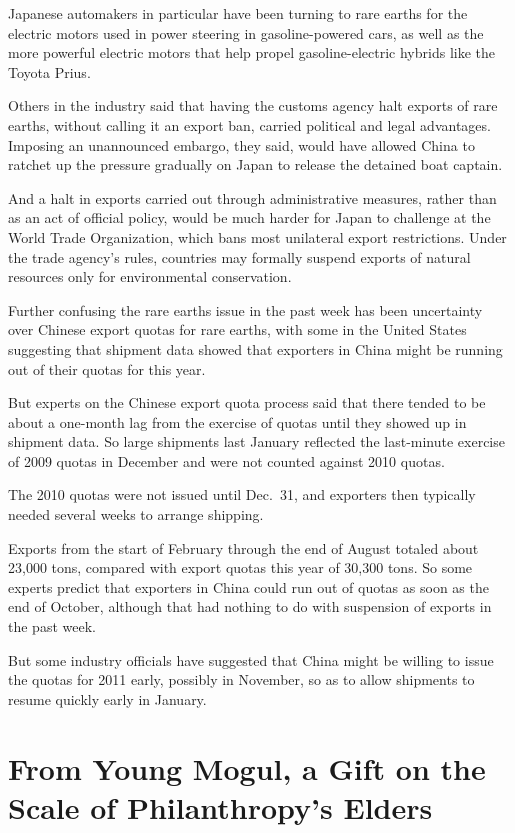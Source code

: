 ﻿\documentclass[12pt]{article}
\begin{document}
Japanese automakers in particular have been turning to rare earths for the electric motors used in
power steering in gasoline-powered cars, as well as the more powerful electric motors that help
propel gasoline-electric hybrids like the Toyota Prius.

Others in the industry said that having the customs agency halt exports of rare earths, without
calling it an export ban, carried political and legal advantages. Imposing an unannounced embargo,
they said, would have allowed China to ratchet up the pressure gradually on Japan to release the
detained boat captain.

And a halt in exports carried out through administrative measures, rather than as an act of official
policy, would be much harder for Japan to challenge at the World Trade Organization, which bans most
unilateral export restrictions. Under the trade agency's rules, countries may formally suspend
exports of natural resources only for environmental conservation.

Further confusing the rare earths issue in the past week has been uncertainty over Chinese export
quotas for rare earths, with some in the United States suggesting that shipment data showed that
exporters in China might be running out of their quotas for this year.

But experts on the Chinese export quota process said that there tended to be about a one-month lag
from the exercise of quotas until they showed up in shipment data. So large shipments last January
reflected the last-minute exercise of 2009 quotas in December and were not counted against 2010
quotas.

The 2010 quotas were not issued until Dec.~31, and exporters then typically needed several weeks to
arrange shipping.

Exports from the start of February through the end of August totaled about 23,000 tons, compared
with export quotas this year of 30,300 tons. So some experts predict that exporters in China could
run out of quotas as soon as the end of October, although that had nothing to do with suspension of
exports in the past week.

But some industry officials have suggested that China might be willing to issue the quotas for 2011
early, possibly in November, so as to allow shipments to resume quickly early in January.

\pagebreak
\section{From Young Mogul, a Gift on the Scale of Philanthropy's Elders}
\end{document}
